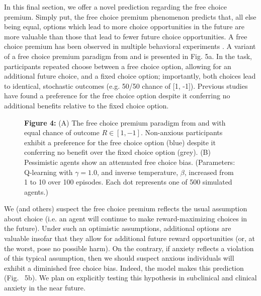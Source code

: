\documentclass[11pt]{article} %
\begin{document}
In this final section, we offer a novel prediction regarding the free choice premium. Simply put, the free choice premium phenomenon predicts that, all else being equal, options which lead to more choice opportunities in the future are more valuable than those that lead to fewer future choice opportunities. A free choice premium has been observed in multiple behavioral experiments \cite{Leotti2010, ly2019}. A variant of a free choice premium paradigm from \cite{Leotti2011} and \cite{Leotti2014} is presented in Fig. 5a. In the task, participants repeated choose between a free choice option, allowing for an additional future choice, and a fixed choice option; importantly, both choices lead to identical, stochastic outcomes (e.g. 50/50 chance of [1, -1]). Previous studies have found a preference for the free choice option despite it conferring no additional benefits relative to the fixed choice option. 

\begin{figure}[!b]
  \centerline{%
  }
  \par \textbf{Figure 4:} (A) The free choice premium paradigm from \cite{Leotti2011} and \cite{Leotti2014} with equal chance of outcome $R \in [1, -1]$. Non-anxious participants exhibit a preference for the free choice option (blue) despite it conferring no benefit over the fixed choice option (grey). (B) Pessimistic agents show an attenuated free choice bias. (Parameters: Q-learning with $\gamma = 1.0$, and inverse temperature, $\beta$, increased from 1 to 10 over 100 episodes. Each dot represents one of 500 simulated agents.)
\end{figure}

We (and others)\citep{ly2019} suspect the free choice premium reflects the usual assumption about choice (i.e. an agent will continue to make reward-maximizing choices in the future). Under such an optimistic assumptions, additional options are valuable insofar that they allow for additional future reward opportunities (or, at the worst, pose no possible harm). On the contrary, if anxiety reflects a violation of this typical assumption, then we should suspect anxious individuals will exhibit a diminished free choice bias. Indeed, the model makes this prediction (Fig. ~5b). We plan on explicitly testing this hypothesis in subclinical and clinical anxiety in the near future.
\end{document}
